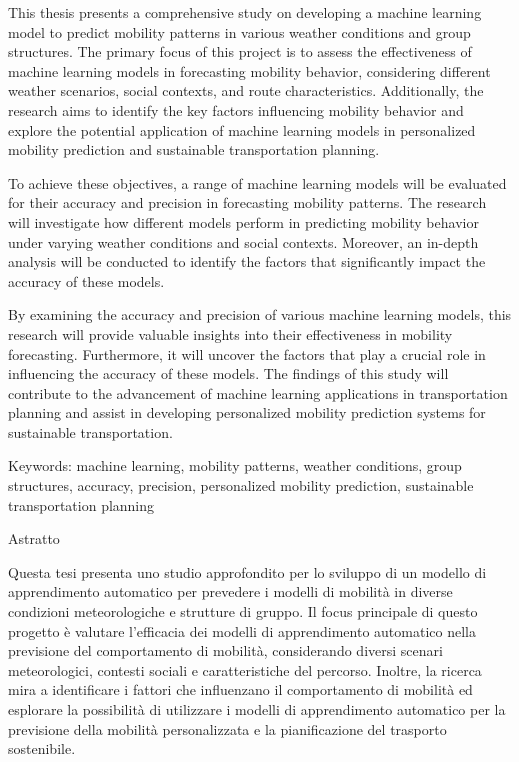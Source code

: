 %
\label{sec:abstract}

This thesis presents a comprehensive study on developing a machine learning model to predict mobility patterns in various weather conditions and group structures. The primary focus of this project is to assess the effectiveness of machine learning models in forecasting mobility behavior, considering different weather scenarios, social contexts, and route characteristics. Additionally, the research aims to identify the key factors influencing mobility behavior and explore the potential application of machine learning models in personalized mobility prediction and sustainable transportation planning.

To achieve these objectives, a range of machine learning models will be evaluated for their accuracy and precision in forecasting mobility patterns. The research will investigate how different models perform in predicting mobility behavior under varying weather conditions and social contexts. Moreover, an in-depth analysis will be conducted to identify the factors that significantly impact the accuracy of these models.

By examining the accuracy and precision of various machine learning models, this research will provide valuable insights into their effectiveness in mobility forecasting. Furthermore, it will uncover the factors that play a crucial role in influencing the accuracy of these models. The findings of this study will contribute to the advancement of machine learning applications in transportation planning and assist in developing personalized mobility prediction systems for sustainable transportation.

Keywords: machine learning, mobility patterns, weather conditions, group structures, accuracy, precision, personalized mobility prediction, sustainable transportation planning

\vspace*{20mm}

{Astratto}
\label{sec:abstract-diff}

Questa tesi presenta uno studio approfondito per lo sviluppo di un modello di apprendimento automatico per prevedere i modelli di mobilità in diverse condizioni meteorologiche e strutture di gruppo. Il focus principale di questo progetto è valutare l'efficacia dei modelli di apprendimento automatico nella previsione del comportamento di mobilità, considerando diversi scenari meteorologici, contesti sociali e caratteristiche del percorso. Inoltre, la ricerca mira a identificare i fattori che influenzano il comportamento di mobilità ed esplorare la possibilità di utilizzare i modelli di apprendimento automatico per la previsione della mobilità personalizzata e la pianificazione del trasporto sostenibile.

